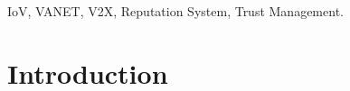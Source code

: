 \documentclass[journal]{IEEEtran}
\begin{document}
\begin{IEEEkeywords}
IoV, VANET, V2X, Reputation System, Trust Management.
\end{IEEEkeywords}






%
\IEEEpeerreviewmaketitle



\section{Introduction}
\end{document}
